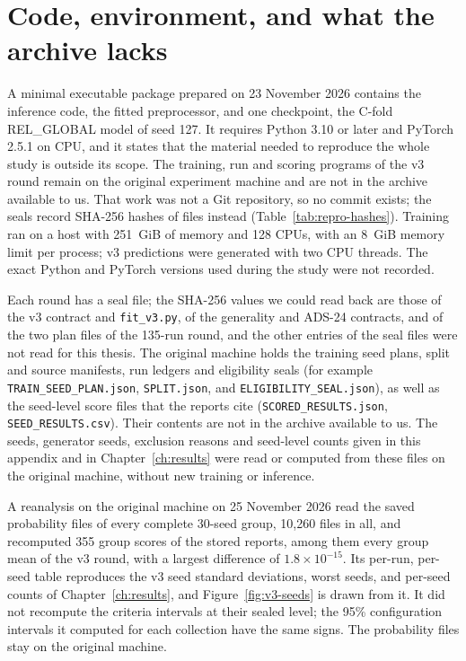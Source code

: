 \section{Code, environment, and what the archive lacks}
\label{sec:repro-code}

A minimal executable package prepared on 23 November 2026 contains the
inference code, the fitted preprocessor, and one checkpoint, the C-fold
REL\_GLOBAL model of seed 127. It requires Python 3.10 or later and
PyTorch 2.5.1 on CPU, and it states that the material needed to
reproduce the whole study is outside its scope. The training, run and
scoring programs of the v3 round remain on the original experiment
machine and are not in the archive available to us. That work was not
a Git repository, so no commit exists; the seals record SHA-256 hashes
of files instead (Table~\ref{tab:repro-hashes}). Training ran on a host with 251~GiB of memory and
128 CPUs, with an 8~GiB memory limit per process; v3 predictions were
generated with two CPU threads. The exact Python and PyTorch versions
used during the study were not recorded.

Each round has a seal file; the SHA-256 values we could read back are
those of the v3 contract and \texttt{fit\_v3.py}, of the generality and
ADS-24 contracts, and of the two plan files of the 135-run round, and
the other entries of the seal files were not read for this thesis. The
original machine holds the training
seed plans, split and source manifests, run ledgers and eligibility
seals (for example \texttt{TRAIN\_SEED\_PLAN.json},
\texttt{SPLIT.json}, and \texttt{ELIGIBILITY\_SEAL.json}), as well as
the seed-level score files that the reports cite
(\texttt{SCORED\_RESULTS.json}, \texttt{SEED\_RESULTS.csv}). Their
contents are not in the archive available to us. The seeds, generator
seeds, exclusion reasons and seed-level counts given in this appendix
and in Chapter~\ref{ch:results} were read or computed from these files
on the original machine, without new training or inference.

A reanalysis on the original machine on 25 November 2026 read the saved
probability files of every complete 30-seed group, 10,260 files in all,
and recomputed 355 group scores of the stored reports, among them every
group mean of the v3 round, with a largest difference of
$1.8\times10^{-15}$. Its per-run, per-seed table reproduces the v3 seed
standard deviations, worst seeds, and per-seed counts of
Chapter~\ref{ch:results}, and Figure~\ref{fig:v3-seeds} is drawn from
it. It did not recompute the criteria intervals at their sealed level;
the 95\% configuration intervals it computed for each collection have
the same signs. The probability files stay on the original machine.

